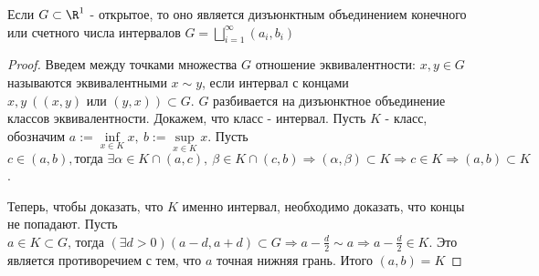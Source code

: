 \begin{theorem}
    Если $G \subset \R^1$ - открытое, то оно является дизъюнктным объединением конечного или счетного числа интервалов $G=\bigsqcup\limits_{i=1}^{\infty}(a_i, b_i)$
\end{theorem}
\begin{proof}
Введем между точками множества $G$ отношение эквивалентности: $x, y\in G$ называются эквивалентными $x\sim y$, если интервал с концами $x, y\ ((x, y)\text{ или }(y,x)) \subset G$. $G$ разбивается на дизъюнктное объединение классов эквивалентности. Докажем, что класс - интервал. Пусть $K$ - класс, обозначим $a:=\inf\limits_{x \in K}x,\ b:=\sup\limits_{x\in K}x$. Пусть 
$c \in (a,b),\text{тогда } \exists \alpha \in K \cap (a, c),\ \beta \in K \cap (c, b) \Rightarrow(\alpha, \beta)\subset K \Rightarrow c \in K \Rightarrow (a,b) \subset K$.

Теперь, чтобы доказать, что $K$ именно интервал, необходимо доказать, что концы не попадают. Пусть $a \in K \subset G\text{, тогда  } (\exists d >0)(a-d, a+d)\subset G \Rightarrow a-\frac{d}{2} \sim a \Rightarrow a-\frac{d}{2} \in K$. Это является противоречием с тем, что $a$ точная нижняя грань. Итого $(a, b)=K$
\end{proof}

